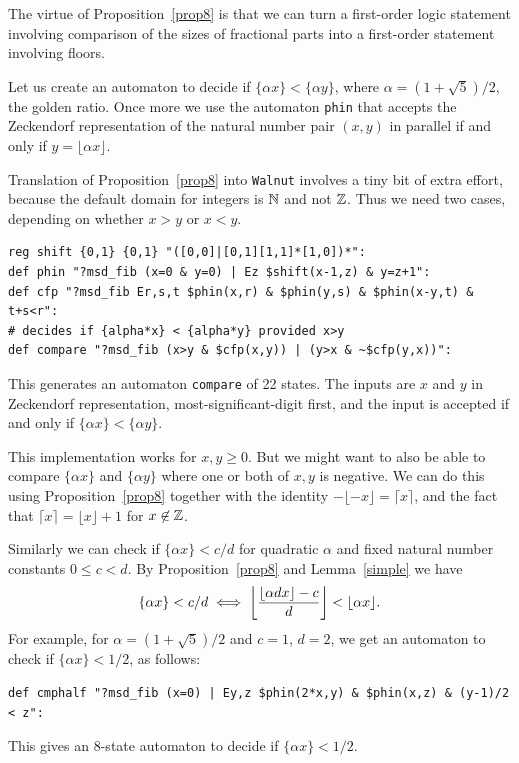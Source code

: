 \documentclass[12pt,reqno]{article}
\begin{document}
The virtue of Proposition~\ref{prop8} is that we can turn a first-order
logic statement involving comparison of the sizes of fractional parts
into a first-order statement involving floors.

\begin{example}
Let us create an automaton to decide if $\lbrace \alpha x \rbrace <
\lbrace \alpha y \rbrace$, where $\alpha = (1+\sqrt{5})/2$, the
golden ratio.  Once more we use the
automaton {\tt phin} that
accepts the Zeckendorf representation of the natural number pair
$(x,y)$ in parallel
if and only if $y = \lfloor \alpha x \rfloor$.

Translation of Proposition~\ref{prop8} into {\tt Walnut} involves a tiny
bit of extra effort, because the default domain for integers is $\mathbb{N}$ and not
$\mathbb{Z}$.  Thus we need two cases, depending on whether $x > y$ or
$x < y$.

\begin{verbatim}
reg shift {0,1} {0,1} "([0,0]|[0,1][1,1]*[1,0])*":
def phin "?msd_fib (x=0 & y=0) | Ez $shift(x-1,z) & y=z+1":
def cfp "?msd_fib Er,s,t $phin(x,r) & $phin(y,s) & $phin(x-y,t) & t+s<r":
# decides if {alpha*x} < {alpha*y} provided x>y
def compare "?msd_fib (x>y & $cfp(x,y)) | (y>x & ~$cfp(y,x))":
\end{verbatim}
This generates an automaton {\tt compare} of 22 states.  The inputs
are $x$ and $y$ in Zeckendorf representation, most-significant-digit
first, and the input is accepted if and only if $\{ \alpha x \} <
\{ \alpha y \}$.

This implementation works for $x, y \geq 0$.  But we might want to also be able
to compare $\{ \alpha x \}$ and $\{ \alpha y \}$ where one or both of $x,y$
is negative.  We can do this using Proposition~\ref{prop8} together with
the identity $-\lfloor -x \rfloor = \lceil x \rceil$, and the fact that
$\lceil x \rceil = \lfloor x \rfloor + 1$ for $x \not\in \mathbb{Z}$.
\end{example}

\begin{example}
Similarly we can check if $\{ \alpha x \} < c/d$ for quadratic
$\alpha$ and fixed natural number
constants $0 \leq c < d$.  By Proposition~\ref{prop8}
and Lemma~\ref{simple}
we have 
$$\{ \alpha x \} < c/d \iff  \left\lfloor {{{\lfloor \alpha d x \rfloor} - c} 
\over {d}} \right\rfloor < \lfloor \alpha x \rfloor .$$
For example, for $\alpha = (1+\sqrt{5})/2$ and $c=1$, $d = 2$,
we get an automaton to check if
$\{\alpha x \} < 1/2$, as follows:
\begin{verbatim}
def cmphalf "?msd_fib (x=0) | Ey,z $phin(2*x,y) & $phin(x,z) & (y-1)/2 < z":
\end{verbatim}
This gives an $8$-state automaton to decide if $\{ \alpha x \} < 1/2$.
\end{example}
\end{document}
